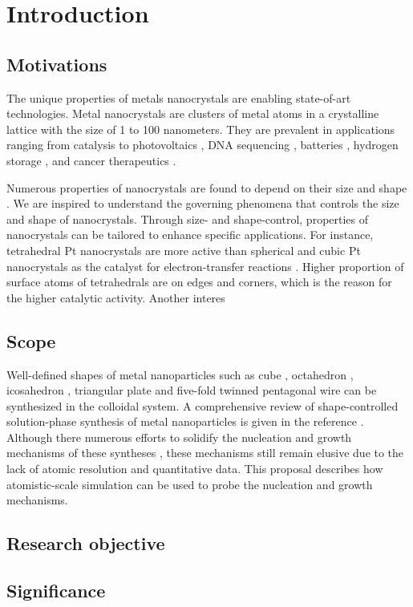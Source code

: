 \section{Introduction}

\subsection{Motivations}

The unique properties of metals nanocrystals are enabling state-of-art technologies.
Metal nanocrystals are clusters of metal atoms in a crystalline lattice with the size of 1 to 100 nanometers.
They are prevalent in applications ranging from catalysis \cite{astruc2008nanoparticles,Astruc_2006} to photovoltaics \cite{Atwater_2010}, DNA sequencing \cite{McNally_2010}, batteries \cite{Panniello_2014}, hydrogen storage \cite{Jena_2011,Ramos_Castillo_2015}, and cancer therapeutics \cite{Jain_2010,Kim_2010}.

Numerous properties of nanocrystals are found to depend on their size \cite{Roduner_2006} and shape \cite{Xia_2008}.
We are inspired to understand the governing phenomena that controls the size and shape of nanocrystals.
Through size- and shape-control, properties of nanocrystals can be tailored to enhance specific applications.
For instance, tetrahedral Pt nanocrystals are more active than spherical and cubic Pt nanocrystals as the catalyst for electron-transfer reactions \cite{Narayanan_2005}.
Higher proportion of surface atoms of tetrahedrals are on edges and corners, which is the reason for the higher catalytic activity.
Another interes

\subsection{Scope}

Well-defined shapes of metal nanoparticles such as cube \cite{Im_2005}, octahedron \cite{Xia_2012}, icosahedron \cite{Xiong_2007}, triangular plate \cite{Lofton_2005} and five-fold twinned pentagonal wire \cite{Tsuji_2008} can be synthesized in the colloidal system. A comprehensive review of shape-controlled solution-phase synthesis of metal nanoparticles is given in the reference \cite{Xia_2008}. Although there numerous efforts to solidify the nucleation and growth mechanisms of these syntheses \cite{Lofton_2005,Mariscal_2012,Park_2013,Viswanath_2009,Liao_2014,Chang_2011,Murph_2015}, these mechanisms still remain elusive due to the lack of atomic resolution and quantitative data. This proposal describes how atomistic-scale simulation can be used to probe the nucleation and growth mechanisms.

\subsection{Research objective}

\subsection{Significance}
    
    